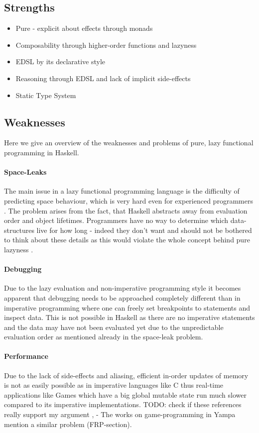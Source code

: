 \subsection{Strengths}
\begin{itemize}
	\item Pure - explicit about effects through monads
	\item Composability through higher-order functions and lazyness
	\item EDSL by its declarative style
	\item Reasoning through EDSL and lack of implicit side-effects 
	\item Static Type System
\end{itemize}

\subsection{Weaknesses}
Here we give an overview of the weaknesses and problems of pure, lazy functional programming in Haskell.

\paragraph{Space-Leaks}
The main issue in a lazy functional programming language is the difficulty of predicting space behaviour, which is very hard even for experienced programmers \cite{hudak_history_2007}. The problem arises from the fact, that Haskell abstracts away from evaluation order and object lifetimes. Programmers have no way to determine which data-structures live for how long - indeed they don't want and should not be bothered to think about these details as this would violate the whole concept behind pure lazyness \cite{hudak_history_2007}.

\paragraph{Debugging}
Due to the lazy evaluation and non-imperative programming style it becomes apparent that debugging needs to be approached completely different than in imperative programming where one can freely set breakpoints to statements and inspect data. This is not possible in Haskell as there are no imperative statements and the data may have not been evaluated yet due to the unpredictable evaluation order as mentioned already in the space-leak problem.

\paragraph{Performance}
Due to the lack of side-effects and aliasing, efficient in-order updates of memory is not as easily possible as in imperative languages like C thus real-time applications like Games which have a big global mutable state run much slower compared to its imperative implementations.
TODO: check if these references really support my argument \cite{mun_hon_functional_2005}, \cite{meisinger_game-engine-architektur_2010} - The works on game-programming in Yampa mention a similar problem (FRP-section).

